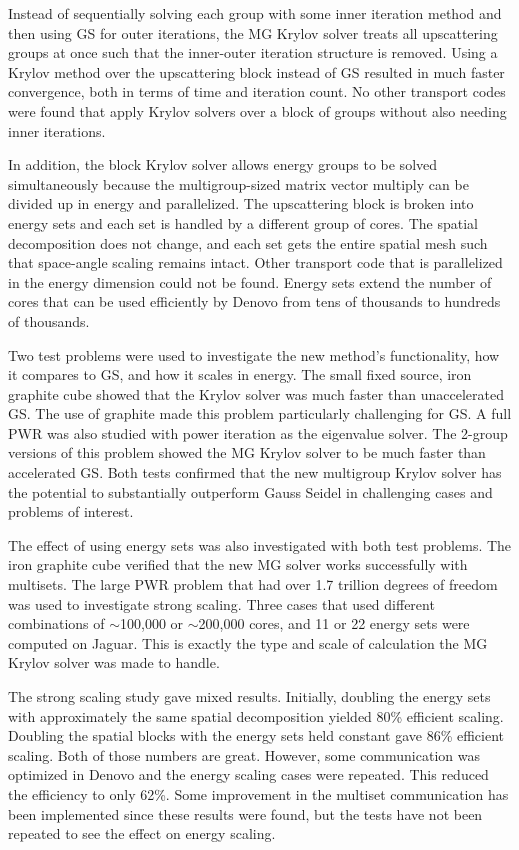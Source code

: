 Instead of sequentially solving each group with some inner iteration method and then using GS for outer iterations, the MG Krylov solver treats all upscattering groups at once such that the inner-outer iteration structure is removed. Using a Krylov method over the upscattering block instead of GS resulted in much faster convergence, both in terms of time and iteration count. No other transport codes were found that apply Krylov solvers over a block of groups without also needing inner iterations. 

In addition, the block Krylov solver allows energy groups to be solved simultaneously because the multigroup-sized matrix vector multiply can be divided up in energy and parallelized. The upscattering block is broken into energy sets and each set is handled by a different group of cores. The spatial decomposition does not change, and each set gets the entire spatial mesh such that space-angle scaling remains intact.  Other \Sn transport code that is parallelized in the energy dimension could not be found. Energy sets extend the number of cores that can be used efficiently by Denovo from tens of thousands to hundreds of thousands. 

Two test problems were used to investigate the new method's functionality, how it compares to GS, and how it scales in energy. The small fixed source, iron graphite cube showed that the Krylov solver was much faster than unaccelerated GS. The use of graphite made this problem particularly challenging for GS. A full PWR was also studied with power iteration as the eigenvalue solver. The 2-group versions of this problem showed the MG Krylov solver to be much faster than accelerated GS. Both tests confirmed that the new multigroup Krylov solver has the potential to substantially outperform Gauss Seidel in challenging cases and problems of interest.  

The effect of using energy sets was also investigated with both test problems. The iron graphite cube verified that the new MG solver works successfully with multisets. The large PWR problem that had over 1.7 trillion degrees of freedom was used to investigate strong scaling. Three cases that used different combinations of $\sim$100,000 or $\sim$200,000 cores, and 11 or 22 energy sets were computed on Jaguar. This is exactly the type and scale of calculation the MG Krylov solver was made to handle.

The strong scaling study gave mixed results. Initially, doubling the energy sets with approximately the same spatial decomposition yielded 80\% efficient scaling. Doubling the spatial blocks with the energy sets held constant gave 86\% efficient scaling. Both of those numbers are great. However, some communication was optimized in Denovo and the energy scaling cases were repeated. This reduced the efficiency to only 62\%. Some improvement in the multiset communication has been implemented since these results were found, but the tests have not been repeated to see the effect on energy scaling. 

